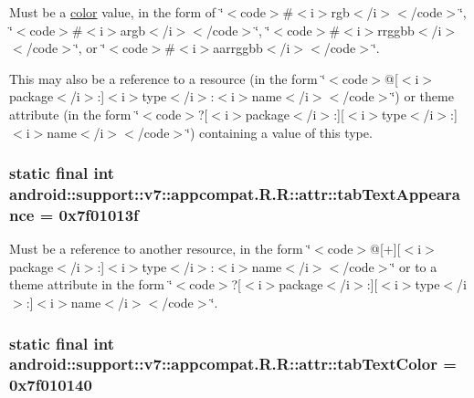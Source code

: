 Must be a \hyperlink{classandroid_1_1support_1_1v7_1_1appcompat_1_1_r_1_1color}{color} value, in the form of \char`\"{}$<$code$>$\#$<$i$>$rgb$<$/i$>$$<$/code$>$\char`\"{}, \char`\"{}$<$code$>$\#$<$i$>$argb$<$/i$>$$<$/code$>$\char`\"{}, \char`\"{}$<$code$>$\#$<$i$>$rrggbb$<$/i$>$$<$/code$>$\char`\"{}, or \char`\"{}$<$code$>$\#$<$i$>$aarrggbb$<$/i$>$$<$/code$>$\char`\"{}. 

This may also be a reference to a resource (in the form \char`\"{}$<$code$>$@\mbox{[}$<$i$>$package$<$/i$>$:\mbox{]}$<$i$>$type$<$/i$>$:$<$i$>$name$<$/i$>$$<$/code$>$\char`\"{}) or theme attribute (in the form \char`\"{}$<$code$>$?\mbox{[}$<$i$>$package$<$/i$>$:\mbox{]}\mbox{[}$<$i$>$type$<$/i$>$:\mbox{]}$<$i$>$name$<$/i$>$$<$/code$>$\char`\"{}) containing a value of this type. \hypertarget{classandroid_1_1support_1_1v7_1_1appcompat_1_1_r_1_1attr_3793623a854fccd51fea356e47904495}{
\subsubsection[{tabTextAppearance}]{\setlength{\rightskip}{0pt plus 5cm}static final int android::support::v7::appcompat.R.R::attr::tabTextAppearance = 0x7f01013f}}
\label{classandroid_1_1support_1_1v7_1_1appcompat_1_1_r_1_1attr_3793623a854fccd51fea356e47904495}


Must be a reference to another resource, in the form \char`\"{}$<$code$>$@\mbox{[}+\mbox{]}\mbox{[}$<$i$>$package$<$/i$>$:\mbox{]}$<$i$>$type$<$/i$>$:$<$i$>$name$<$/i$>$$<$/code$>$\char`\"{} or to a theme attribute in the form \char`\"{}$<$code$>$?\mbox{[}$<$i$>$package$<$/i$>$:\mbox{]}\mbox{[}$<$i$>$type$<$/i$>$:\mbox{]}$<$i$>$name$<$/i$>$$<$/code$>$\char`\"{}. \hypertarget{classandroid_1_1support_1_1v7_1_1appcompat_1_1_r_1_1attr_5be6e0937a6b1f1ace4e24d0567e538a}{
\subsubsection[{tabTextColor}]{\setlength{\rightskip}{0pt plus 5cm}static final int android::support::v7::appcompat.R.R::attr::tabTextColor = 0x7f010140}}
\label{classandroid_1_1support_1_1v7_1_1appcompat_1_1_r_1_1attr_5be6e0937a6b1f1ace4e24d0567e538a}


